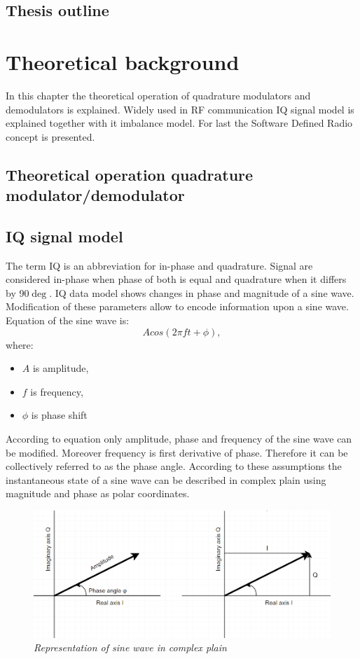 \documentclass[en,printmode]{mgr}
\begin{document}
	\section{Thesis outline}
	
\chapter{Theoretical background}
	In this chapter the theoretical operation of quadrature modulators and demodulators is explained. Widely
		used in RF communication IQ signal model is explained together with it imbalance model. For last the
	Software Defined Radio concept is presented.
	\section{Theoretical operation quadrature modulator/demodulator}
		
	\section{IQ signal model}
			The term IQ is an abbreviation for in-phase and quadrature. Signal are considered in-phase when phase
		of both is equal and quadrature when it differs by 90$\deg$. IQ data model shows changes in phase and
		magnitude of a sine wave. Modification of these parameters allow to encode information upon a sine wave.
		\\
		
		\noindent				
		Equation of the sine wave is:
		\[
			A cos\left(2\pi f t+ \phi\right), \label{eq:sinewave}
		\]
		where:
		\begin{itemize}
			\item $A$ is amplitude,
			\item $f$ is frequency,
			\item $\phi$ is phase shift
		\end{itemize}
		
		According to equation \label{eq:sinewave} only amplitude, phase and frequency of the sine wave can be
		modified. Moreover frequency is first derivative of phase. Therefore it can be collectively referred to 
		as the phase angle. According to these assumptions the instantaneous state of a sine wave can be described
		in complex plain using magnitude and phase as polar coordinates.
		
		\begin{figure}[!htb]
    		\centering
   			\includegraphics[width=\textwidth]{plots/polarplots.png}
    		\caption{\textit{Representation of sine wave in complex plain}}
    		\label{fig:polarplot}
		\end{figure}
		
\end{document}
